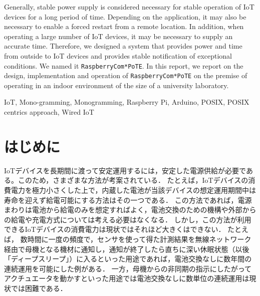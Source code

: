 \begin{eabstract}
Generally, stable power supply is considered necessary for stable operation of IoT devices for a long period of time.
Depending on the application, it may also be necessary to enable a forced restart from a remote location.
In addition, when operating a large number of IoT devices, it may be necessary to supply an accurate time.
Therefore, we designed a system that provides power and time from outside to IoT devices and provides stable notification of exceptional conditions. We named it {\tt Raspberry\-Com*PoTE}.
In this report, we report on the design, implementation and operation of {\tt Raspberry\-Com*PoTE} on the premise of operating in an indoor environment of the size of a university laboratory.

\end{eabstract}

\begin{ekeyword}
IoT, Mono-gramming, Monogramming, Raspberry Pi, Arduino, POSIX, POSIX centrics approach, Wired IoT
\end{ekeyword}

\maketitle




\section{はじめに}
\label{sec:01introduction}

IoTデバイスを長期間に渡って安定運用するには，安定した電源供給が必要である。このため，さまざまな方法が考案されている．
たとえば，IoTデバイスの消費電力を極力小さくした上で，内蔵した電池が当該デバイスの想定運用期間中は寿命を迎えず給電可能にする方法はその一つである．
この方法であれば，電源まわりは電池から給電のみを想定すればよく，電池交換のための機構や外部からの給電や充電方式については考える必要はなくなる．
しかし，この方法が利用できるIoTデバイスの消費電力は現状ではそれほど大きくはできない．
たとえば，
数時間に一度の頻度で，センサを使って得た計測結果を無線ネットワーク経由で母機となる機材に通知し，通知が終了したら直ちに深い休眠状態（以後「ディープスリープ」）に入るといった用途であれば，電池交換なしに数年間の連続運用を可能にした例がある．
一方，母機からの非同期の指示にしたがってアクチュエータを動かすといった用途では電池交換なしに数単位の連続運用は現状では困難である．

